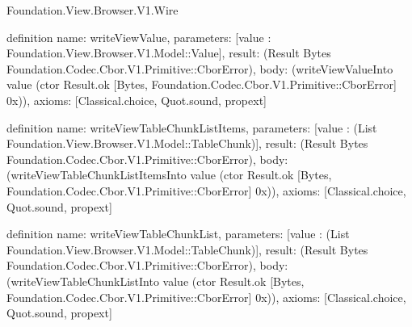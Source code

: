 \begin{lexlean}{Foundation.View.Browser.V1.Wire}
\begin{semanticmodule}
definition{
  name: writeViewValue,
  parameters: [value : Foundation.View.Browser.V1.Model::Value],
  result: (Result Bytes Foundation.Codec.Cbor.V1.Primitive::CborError),
  body: (writeViewValueInto value (ctor Result.ok [Bytes, Foundation.Codec.Cbor.V1.Primitive::CborError] 0x)),
  axioms: [Classical.choice, Quot.sound, propext]
}

definition{
  name: writeViewTableChunkListItems,
  parameters: [value : (List Foundation.View.Browser.V1.Model::TableChunk)],
  result: (Result Bytes Foundation.Codec.Cbor.V1.Primitive::CborError),
  body: (writeViewTableChunkListItemsInto value (ctor Result.ok [Bytes, Foundation.Codec.Cbor.V1.Primitive::CborError] 0x)),
  axioms: [Classical.choice, Quot.sound, propext]
}

definition{
  name: writeViewTableChunkList,
  parameters: [value : (List Foundation.View.Browser.V1.Model::TableChunk)],
  result: (Result Bytes Foundation.Codec.Cbor.V1.Primitive::CborError),
  body: (writeViewTableChunkListInto value (ctor Result.ok [Bytes, Foundation.Codec.Cbor.V1.Primitive::CborError] 0x)),
  axioms: [Classical.choice, Quot.sound, propext]
}
\end{semanticmodule}
\end{lexlean}
